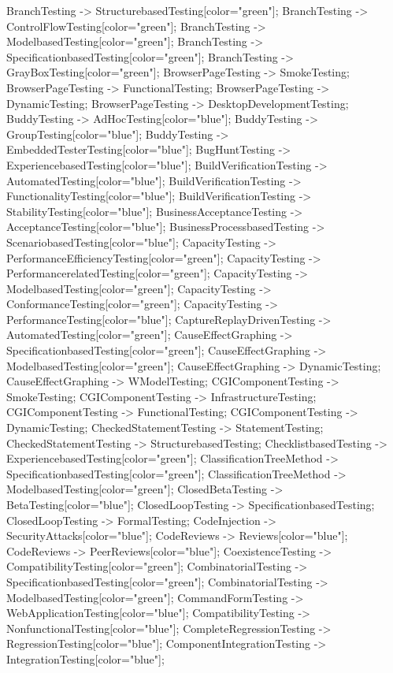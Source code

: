 \documentclass{article}
\begin{document}
{BranchTesting -> StructurebasedTesting[color="green"];
BranchTesting -> ControlFlowTesting[color="green"];
BranchTesting -> ModelbasedTesting[color="green"];
BranchTesting -> SpecificationbasedTesting[color="green"];
BranchTesting -> GrayBoxTesting[color="green"];
BrowserPageTesting -> SmokeTesting;
BrowserPageTesting -> FunctionalTesting;
BrowserPageTesting -> DynamicTesting;
BrowserPageTesting -> DesktopDevelopmentTesting;
BuddyTesting -> AdHocTesting[color="blue"];
BuddyTesting -> GroupTesting[color="blue"];
BuddyTesting -> EmbeddedTesterTesting[color="blue"];
BugHuntTesting -> ExperiencebasedTesting[color="blue"];
BuildVerificationTesting -> AutomatedTesting[color="blue"];
BuildVerificationTesting -> FunctionalityTesting[color="blue"];
BuildVerificationTesting -> StabilityTesting[color="blue"];
BusinessAcceptanceTesting -> AcceptanceTesting[color="blue"];
BusinessProcessbasedTesting -> ScenariobasedTesting[color="blue"];
CapacityTesting -> PerformanceEfficiencyTesting[color="green"];
CapacityTesting -> PerformancerelatedTesting[color="green"];
CapacityTesting -> ModelbasedTesting[color="green"];
CapacityTesting -> ConformanceTesting[color="green"];
CapacityTesting -> PerformanceTesting[color="blue"];
CaptureReplayDrivenTesting -> AutomatedTesting[color="green"];
CauseEffectGraphing -> SpecificationbasedTesting[color="green"];
CauseEffectGraphing -> ModelbasedTesting[color="green"];
CauseEffectGraphing -> DynamicTesting;
CauseEffectGraphing -> WModelTesting;
CGIComponentTesting -> SmokeTesting;
CGIComponentTesting -> InfrastructureTesting;
CGIComponentTesting -> FunctionalTesting;
CGIComponentTesting -> DynamicTesting;
CheckedStatementTesting -> StatementTesting;
CheckedStatementTesting -> StructurebasedTesting;
ChecklistbasedTesting -> ExperiencebasedTesting[color="green"];
ClassificationTreeMethod -> SpecificationbasedTesting[color="green"];
ClassificationTreeMethod -> ModelbasedTesting[color="green"];
ClosedBetaTesting -> BetaTesting[color="blue"];
ClosedLoopTesting -> SpecificationbasedTesting;
ClosedLoopTesting -> FormalTesting;
CodeInjection -> SecurityAttacks[color="blue"];
CodeReviews -> Reviews[color="blue"];
CodeReviews -> PeerReviews[color="blue"];
CoexistenceTesting -> CompatibilityTesting[color="green"];
CombinatorialTesting -> SpecificationbasedTesting[color="green"];
CombinatorialTesting -> ModelbasedTesting[color="green"];
CommandFormTesting -> WebApplicationTesting[color="blue"];
CompatibilityTesting -> NonfunctionalTesting[color="blue"];
CompleteRegressionTesting -> RegressionTesting[color="blue"];
ComponentIntegrationTesting -> IntegrationTesting[color="blue"];
}
\end{document}
